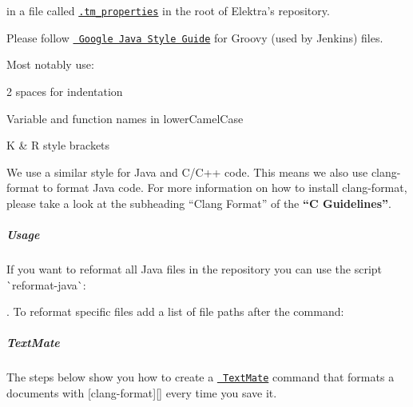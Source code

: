 \begin{DoxyCode}{0}
\end{DoxyCode}


in a file called \href{https://macromates.com/blog/2011/git-style-configuration}{\texttt{ {\ttfamily .tm\+\_\+properties}}} in the root of Elektra’s repository.

Please follow \href{https://google.github.io/styleguide/javaguide.html}{\texttt{ Google Java Style Guide}} for Groovy (used by Jenkins) files.

Most notably use\+:


\begin{DoxyItemize}
\item 2 spaces for indentation
\item Variable and function names in lower\+Camel\+Case
\item K \& R style brackets
\end{DoxyItemize}

We use a similar style for Java and C/\+C++ code. This means we also use {\ttfamily clang-\/format} to format Java code. For more information on how to install {\ttfamily clang-\/format}, please take a look at the subheading “\+Clang Format” of the {\bfseries{“C Guidelines”}}.

\label{doc_CODING_md_autotoc_md996}%
%
\subparagraph*{Usage}

If you want to reformat all Java files in the repository you can use the script \`{}reformat-\/java\`{}\+:


\begin{DoxyCode}{0}
\end{DoxyCode}


. To reformat specific files add a list of file paths after the command\+:


\begin{DoxyCode}{0}
\end{DoxyCode}


\subparagraph*{Text\+Mate}

The steps below show you how to create a \href{https://macromates.com}{\texttt{ Text\+Mate}} command that formats a documents with \mbox{[}{\ttfamily clang-\/format}\mbox{]}\mbox{[}\mbox{]} every time you save it.



